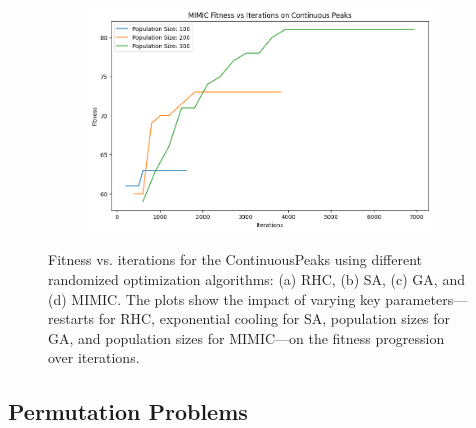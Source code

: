 \begin{figure}[htbp]
\begin{subfigure}[b]{0.49\textwidth}
        \caption{}
        \label{fig:continuouspeakga}
    \end{subfigure}
    \hfill
    \begin{subfigure}[b]{0.49\textwidth}
        \centering
        \includegraphics[width=\textwidth]{image/continuouspeak/mimic.png}
        \caption{}
        \label{fig:continuouspeakmimic}
    \end{subfigure}
    \caption{Fitness vs. iterations for the ContinuousPeaks using different randomized optimization algorithms: (a) RHC, (b) SA, (c) GA, and (d) MIMIC. The plots show the impact of varying key parameters—restarts for RHC, exponential cooling for SA, population sizes for GA, and population sizes for MIMIC—on the fitness progression over iterations.}
    \label{fig:continuouspeakgrid}
\end{figure}

\subsection{Permutation Problems}

